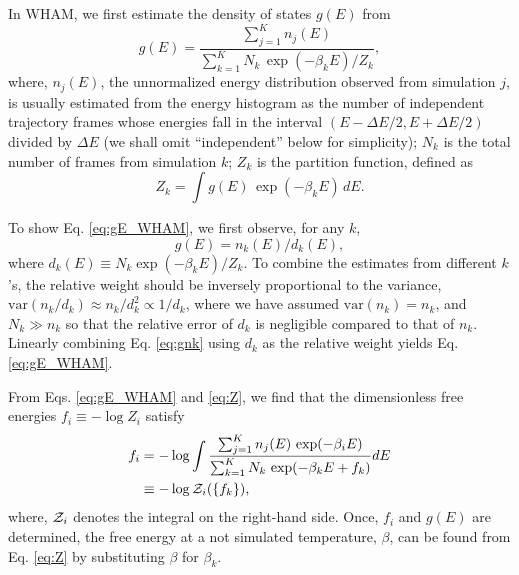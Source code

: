 \documentclass[reprint,aip,jcp,superscriptaddress]{revtex4-1}
\begin{document}
In WHAM,
we first estimate the density of states $g(E)$ from
%
\begin{equation}
g(E)
=
\frac{
  \sum_{j = 1}^K n_j(E)
}
{
  \sum_{k = 1}^K N_k \, \exp(-\beta_k E) / Z_k
},
\label{eq:gE_WHAM}
\end{equation}
%
where,
$n_j(E)$,
the unnormalized energy distribution
observed from simulation $j$,
is usually estimated
from the energy histogram as
the number of independent trajectory frames
whose energies fall in the interval
$(E - \Delta E/2, E + \Delta E/2)$
divided by $\Delta E$
(we shall omit ``independent'' below for simplicity);
%
$N_k$
is the total number of frames
from simulation $k$;
%
$Z_k$
is the partition function,
defined as
%
\begin{equation}
Z_k
=
\int g(E) \, \exp(-\beta_k E) \, dE.
\label{eq:Z}
\end{equation}



To show Eq. \eqref{eq:gE_WHAM},
we first observe, for any $k$,
\begin{equation}
  g(E) = n_k(E) / d_k(E),
  \label{eq:gnk}
\end{equation}
where $d_k(E) \equiv N_k \exp(-\beta_k E)/Z_k$.
%
To combine the estimates from different $k$'s,
the relative weight should be inversely
proportional to the variance\cite{
newman, *frenkel},
$\mathrm{var}(n_k/d_k) \approx n_k / d_k^2 \propto 1/d_k$,
where we have assumed $\mathrm{var}(n_k) = n_k$,
and $N_k \gg n_k$ so that
the relative error of $d_k$ is negligible
compared to that of $n_k$.
%
Linearly combining Eq. \eqref{eq:gnk}
using $d_k$ as the relative weight yields
Eq. \eqref{eq:gE_WHAM}\cite{souaille2001}.



From Eqs. \eqref{eq:gE_WHAM} and \eqref{eq:Z},
we find that the dimensionless free energies
$f_i \equiv -\log Z_i$
satisfy
\begin{align}
f_i
&=
-\log
  \int
    \frac{
      \sum_{j = 1}^K n_j(E) \, \exp(-\beta_i E)
    }
    {
      \sum_{k = 1}^K N_k \, \exp(-\beta_k E + f_k)
    }
    dE
\label{eq:f_WHAM}
\\
&\equiv
-\log \mathcal{Z}_i(\{ f_k \}),
\notag
\end{align}
%
where,
$\mathcal{Z}_i$
denotes the integral on the right-hand side.
%
Once, $f_i$ and $g(E)$ are determined,
the free energy at a not simulated temperature, $\beta$,
can be found from Eq. \eqref{eq:Z}
by substituting $\beta$ for $\beta_k$.
\end{document}
